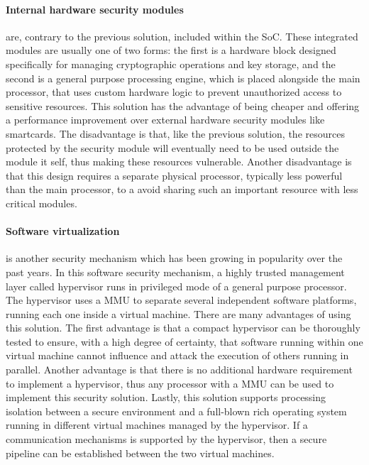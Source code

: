 \paragraph{\textbf{Internal hardware security modules}} are, contrary to the previous solution, included within the \ac{SoC}. These integrated modules are usually one of two forms: the first is a hardware block designed specifically for managing cryptographic operations and key storage, and the second is a general purpose processing engine, which is placed alongside the main processor, that uses custom hardware logic to prevent unauthorized access to sensitive resources. This solution has the advantage of being cheaper and offering a performance improvement over external hardware security modules like smartcards. The disadvantage is that, like the previous solution, the resources protected by the security module will eventually need to be used outside the module it self, thus making these resources vulnerable. Another disadvantage is that this design requires a separate physical processor, typically less powerful than the main processor, to a avoid sharing such an important resource with less critical modules.

\paragraph{\textbf{Software virtualization}} is another security mechanism which has been growing in popularity over the past years. In this software security mechanism, a highly trusted management layer called hypervisor runs in privileged mode of a general purpose processor. The hypervisor uses a \ac{MMU} to separate several independent software platforms, running each one inside a virtual machine. There are many advantages of using this solution. The first advantage is that a compact hypervisor can be thoroughly tested to ensure, with a high degree of certainty, that software running within one virtual machine cannot influence and attack the execution of others running in parallel. Another advantage is that there is no additional hardware requirement to implement a hypervisor, thus any processor with a \ac{MMU} can be used to implement this security solution. Lastly, this solution supports processing isolation between a secure environment and a full-blown rich operating system running in different virtual machines managed by the hypervisor. If a communication mechanisms is supported by the hypervisor, then a secure pipeline can be established between the two virtual machines.

